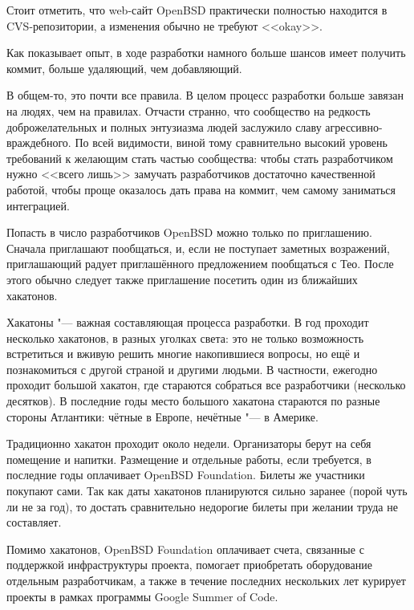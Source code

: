 \documentclass[10pt, a5paper]{article}
\begin{document}
Стоит отметить, что web-сайт OpenBSD практически полностью находится в CVS-репозитории, а изменения обычно не требуют <<okay>>.

Как показывает опыт, в ходе разработки намного больше шансов имеет получить коммит, больше удаляющий, чем добавляющий.

В общем-то, это почти все правила. В целом процесс разработки больше завязан на людях, чем на правилах. Отчасти странно, что сообщество на редкость доброжелательных и полных энтузиазма людей заслужило славу агрессивно-враждебного. По всей видимости, виной тому сравнительно высокий уровень требований к желающим стать частью сообщества: чтобы стать разработчиком нужно <<всего лишь>> замучать разработчиков достаточно качественной работой, чтобы проще оказалось дать права на коммит, чем самому заниматься интеграцией.

Попасть в число разработчиков OpenBSD можно только по приглашению. Сначала приглашают пообщаться, и, если не поступает заметных возражений, приглашающий радует приглашённого предложением пообщаться с Тео. После этого обычно следует также приглашение посетить один из ближайших хакатонов.

Хакатоны "--- важная составляющая процесса разработки. В год проходит несколько хакатонов, в разных уголках света: это не только возможность встретиться и вживую решить многие накопившиеся вопросы, но ещё и познакомиться с другой страной и другими людьми. В частности, ежегодно проходит большой хакатон, где стараются собраться все разработчики (несколько десятков). В последние годы место большого хакатона стараются по разные стороны Атлантики: чётные в Европе, нечётные "--- в Америке.

Традиционно хакатон проходит около недели. Организаторы берут на себя помещение и напитки. Размещение и отдельные работы, если требуется, в последние годы оплачивает OpenBSD Foundation. Билеты же участники покупают сами. Так как даты хакатонов планируются сильно заранее (порой чуть ли не за год), то достать сравнительно недорогие билеты при желании труда не составляет.

Помимо хакатонов, OpenBSD Foundation оплачивает счета, связанные с поддержкой инфраструктуры проекта, помогает приобретать оборудование отдельным разработчикам, а также в течение последних нескольких лет курирует проекты в рамках программы Google Summer of Code.
\end{document}
